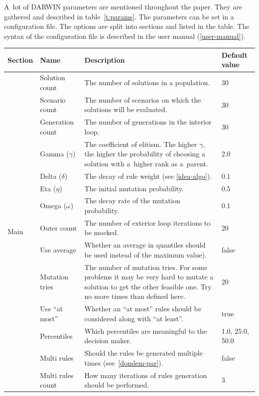 A~lot of DARWIN parameters are mentioned throughout the paper. They are
gathered and described in table~\ref{t:params}. The parameters can be set in a
configuration file. The options are split into sections and listed in the
table. The syntax of the configuration file is described in the user manual
(\ref{user-manual}).

\begin{table}
  \centering
  \begin{tabular}{l l p{7cm} l}
    \hline
    Section &  Name & Description & Default value \\
    \hline
    \hline
    \multirow{15}{*}{Main} & 
    Solution count & The number of solutions in a population. & 30 \\
    & Scenario count & The number of scenarios on which the solutions will be evaluated.  & 30 \\
    & Generation count & The number of generations in the interior loop. & 30 \\
    & Gamma ($\gamma$) & The coefficient of elitism. The higher $\gamma$, the
    higher the probability of choosing a solution with a~higher rank as
    a~parent. & 2.0  \\
    & Delta ($\delta$) & The decay of rule weight (see \ref{idea-algo}). & 0.1  \\
    & Eta ($\eta$) & The initial mutation probability.  & 0.5    \\
    & Omega ($\omega$)& The decay rate of the mutation probability. & 0.1  \\
    & Outer count & The number of exterior loop iterations to be mocked. & 20 \\
    & Use average & Whether an average in quantiles should be used instead of
    the maximum value). & false  \\
    & Mutation tries & The number of mutation tries. For some problems it may be
    very hard to mutate a solution to get the other feasible one. Try no more
    times than defined here.  & 20  \\
    & Use ``at most'' & Whether an ``at most'' rules should be considered
    along with ``at least''. & true \\
    & Percentiles & Which percentiles are meaningful to the decision maker. & 1.0, 25.0, 50.0  \\
    & Multi rules & Should the rules be generated multiple times (see~\ref{domlem-par}). & false \\
    & Multi rules count & How many iterations of rules generation should be performed. & 3 \\

\end{tabular}
\end{table}
